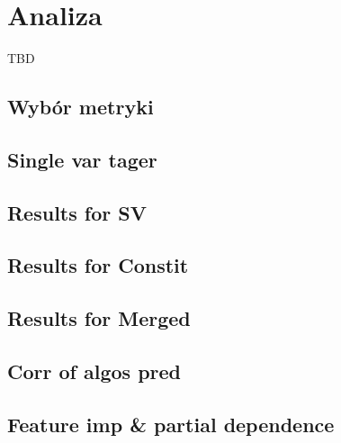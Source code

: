 \section{Analiza}
\label{sec:analiza}

TBD 
\subsection*{Wybór metryki}
\subsection*{Single var tager}
\subsection*{Results for SV}
\subsection*{Results for Constit}
\subsection*{Results for Merged}
\subsection*{Corr of algos pred}
\subsection*{Feature imp \& partial dependence}